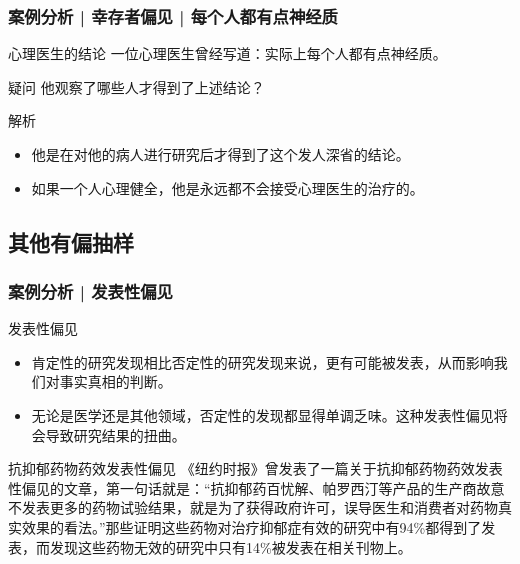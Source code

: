 \begin{frame}
  \frametitle{案例分析 | 幸存者偏见 | 每个人都有点神经质}
  \begin{block}{心理医生的结论}
    一位心理医生曾经写道：实际上每个人都有点神经质。
  \end{block}
  \pause
  \begin{block}{疑问}
    他观察了哪些人才得到了上述结论？
  \end{block}
  \pause
  \begin{block}{解析}
    \begin{itemize}
      \item 他是在对他的病人进行研究后才得到了这个发人深省的结论。
      \item 如果一个人心理健全，他是永远都不会接受心理医生的治疗的。
    \end{itemize}
  \end{block}
\end{frame}

\subsection{其他有偏抽样}
\begin{frame}
  \frametitle{案例分析 | 发表性偏见}
  \begin{block}{发表性偏见}
    \begin{itemize}
      \item 肯定性的研究发现相比否定性的研究发现来说，更有可能被发表，从而影响我们对事实真相的判断。
      \item 无论是医学还是其他领域，否定性的发现都显得单调乏味。这种发表性偏见将会导致研究结果的扭曲。
    \end{itemize}
  \end{block}
  \pause
  \begin{block}{抗抑郁药物药效发表性偏见}
    《纽约时报》曾发表了一篇关于抗抑郁药物药效发表性偏见的文章，第一句话就是：“抗抑郁药百忧解、帕罗西汀等产品的生产商故意不发表更多的药物试验结果，就是为了获得政府许可，误导医生和消费者对药物真实效果的看法。”那些证明这些药物对治疗抑郁症有效的研究中有94\%都得到了发表，而发现这些药物无效的研究中只有14\%被发表在相关刊物上。
  \end{block}
\end{frame}

